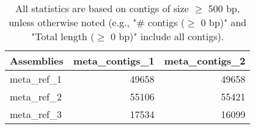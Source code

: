 \documentclass[12pt,a4paper]{article}
\begin{document}
\begin{table}[ht]
\begin{center}
\caption{All statistics are based on contigs of size $\geq$ 500 bp, unless otherwise noted (e.g., "\# contigs ($\geq$ 0 bp)" and "Total length ($\geq$ 0 bp)" include all contigs).}
\begin{tabular}{|l*{2}{|r}|}
\hline
Assemblies & meta\_contigs\_1 & meta\_contigs\_2 \\ \hline
meta\_ref\_1 & 49658 & 49658 \\ \hline
meta\_ref\_2 & 55106 & 55421 \\ \hline
meta\_ref\_3 & 17534 & 16099 \\ \hline
\end{tabular}
\end{center}
\end{table}
\end{document}
